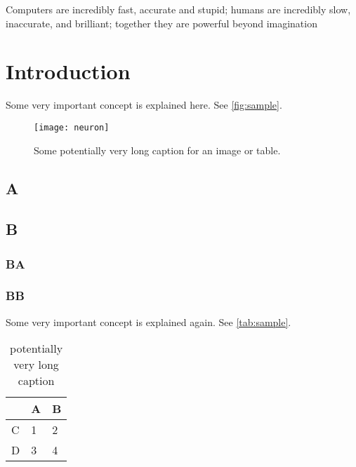 

\begin{savequote}[8cm]
Computers are incredibly fast, accurate and stupid; humans are incredibly slow, inaccurate, and brilliant; together they are powerful beyond imagination
%
%
\end{savequote}

\chapter{Introduction}\label{ch:1-intro}%
%

\begin{chapterabstract}
  \kant[4]
\end{chapterabstract}

\minitoc

\kant[5]
Some very important concept is explained here. See \autoref{fig:sample}.

\begin{figure}[htb]
  \centering
  \texttt{[image: neuron]}
  \caption[Some shorter caption for the LOF]{Some potentially very long caption for an image or table.}\label{fig:sample}
\end{figure}

\section{A}
\kant[6-10]

\section{B}
\kant[11]

\subsection{BA}
\kant[12-14]

\subsection{BB}
\kant[14-16]
Some very important concept is explained again. See \autoref{tab:sample}.

\begin{table}
  \centering
  \begin{tabular}{lll}
    \toprule
     & A & B \\
    \midrule
    C & 1 & 2 \\
    D & 3 & 4 \\
    \bottomrule
  \end{tabular}\caption[shorter caption]{potentially very long caption}\label{tab:sample}
\end{table}

